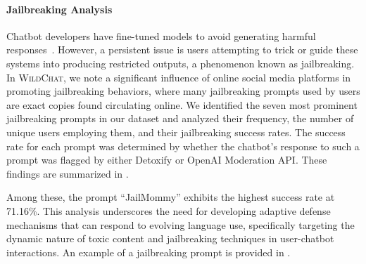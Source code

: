 \documentclass{article} %
\newcommand{\corpus}{\textsc{WildChat}\xspace}
\begin{document}
\paragraph{Jailbreaking Analysis}
Chatbot developers have fine-tuned models to avoid generating harmful responses~\citep{OpenAI2023GPT4TR}. However, a persistent issue is users attempting to trick or guide these systems into producing restricted outputs, a phenomenon known as jailbreaking. In \corpus, we note a significant influence of online social media platforms in promoting jailbreaking behaviors, where many jailbreaking prompts used by users are exact copies found circulating online. We identified the seven most prominent jailbreaking prompts in our dataset and analyzed their frequency, the number of unique users employing them, and their jailbreaking success rates. The success rate for each prompt was determined by whether the chatbot’s response to such a prompt was flagged by either Detoxify or OpenAI Moderation API. These findings are summarized in .

Among these, the prompt ``JailMommy'' exhibits the highest success rate at 71.16\%. This analysis underscores the need for developing adaptive defense mechanisms that can respond to evolving language use, specifically targeting the dynamic nature of toxic content and jailbreaking techniques in user-chatbot interactions. An example of a jailbreaking prompt is provided in .


\end{document}
